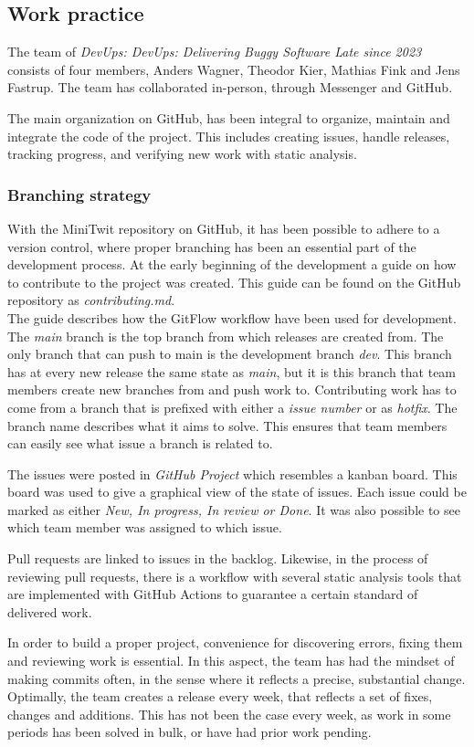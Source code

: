 \subsection{Work practice}
The team of \textit{DevUps: DevUps: Delivering Buggy Software Late since 2023} consists of four members, Anders Wagner, Theodor Kier, Mathias Fink and Jens Fastrup. The team has collaborated in-person, through Messenger and GitHub.

The main organization on GitHub, has been integral to organize, maintain and integrate the code of the project. This includes creating issues, handle releases, tracking progress, and verifying new work with static analysis.

\subsubsection{Branching strategy}
With the MiniTwit repository on GitHub, it has been possible to adhere to a version control, where proper branching has been an essential part of the development process. At the early beginning of the development a guide on how to contribute to the project was created. This guide can be found on the GitHub repository as \textit{contributing.md}.\\

The guide describes how the GitFlow workflow\cite{gitflow} have been used for development. The \textit{main} branch is the top branch from which releases are created from. The only branch that can push to main is the development branch \textit{dev}. This branch has at every new release the same state as \textit{main}, but it is this branch that team members create new branches from and push work to. Contributing work has to come from a branch that is prefixed with either a \textit{issue number} or as \textit{hotfix}. The branch name describes what it aims to solve. This ensures that team members can easily see what issue a branch is related to.

The issues were posted in \textit{GitHub Project} which resembles a kanban board. This board was used to give a graphical view of the state of issues. Each issue could be marked as either \textit{New, In progress, In review or Done}. It was also possible to see which team member was assigned to which issue. 

Pull requests are linked to issues in the backlog. Likewise, in the process of reviewing pull requests, there is a workflow with several static analysis tools that are implemented with GitHub Actions to guarantee a certain standard of delivered work.

In order to build a proper project, convenience for discovering errors, fixing them and reviewing work is essential. In this aspect, the team has had the mindset of making commits often, in the sense where it reflects a precise, substantial change. Optimally, the team creates a release every week, that reflects a set of fixes, changes and additions. This has not been the case every week, as work in some periods has been solved in bulk, or have had prior work pending. 
